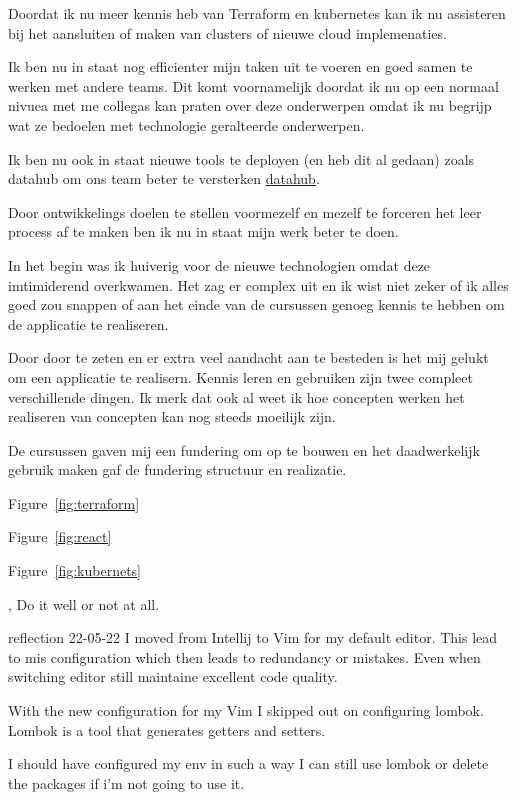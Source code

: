 {{{		}
		{%
			Doordat ik nu meer kennis heb van Terraform en kubernetes kan ik nu assisteren bij het aansluiten of maken van clusters of nieuwe cloud implemenaties.

			Ik ben nu in staat nog efficienter mijn taken uit te voeren en goed samen te werken met andere teams.
			Dit komt voornamelijk doordat ik nu op een normaal nivuea met me collegas kan praten over deze onderwerpen omdat ik nu begrijp wat ze bedoelen met technologie geralteerde onderwerpen.

			Ik ben nu ook in staat nieuwe tools te deployen (en heb dit al gedaan) zoals datahub om ons team beter te versterken \href{https://datahubproject.io/}{datahub}.

		}
		{%
			Door ontwikkelings doelen te stellen voormezelf en mezelf te forceren het leer process af te maken ben ik nu in staat mijn werk beter te doen.

			In het begin was ik huiverig voor de nieuwe technologien omdat deze imtimiderend overkwamen.
			Het zag er complex uit en ik wist niet zeker of ik alles goed zou snappen of aan het einde van de cursussen genoeg kennis te hebben om de applicatie te realiseren.

			Door door te zeten en er extra veel aandacht aan te besteden is het mij gelukt om een applicatie te realisern.
			Kennis leren en gebruiken zijn twee compleet verschillende dingen.
			Ik merk dat ook al weet ik hoe concepten werken het realiseren van concepten kan nog steeds moeilijk zijn.

			De cursussen gaven mij een fundering om op te bouwen en het daadwerkelijk gebruik maken gaf de fundering structuur en realizatie.
		}
		{


		}
	}
	{%

		Figure~\ref{fig:terraform}

		Figure~\ref{fig:react}

		Figure~\ref{fig:kubernets}
	},
	\bewijs
	{
		Do it well or not at all.
	}
	{%
		\starr
		{%
			reflection
		}
		{%
			22-05-22
		}
		{%
			I moved from Intellij to Vim for my default editor.
			This lead to mis configuration which then leads to redundancy or mistakes.
		}
		{%
			Even when switching editor still maintaine excellent code quality.
		}
		{%
			With the new configuration for my Vim I skipped out on configuring lombok.
			Lombok is a tool that generates getters and setters.


			I should have configured my env in such a way I can still use lombok or delete the packages if i'm not going to use it.

}}}
